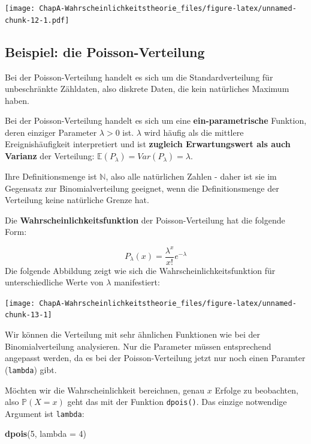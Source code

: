 \documentclass[]{book}
\newenvironment{Shaded}{\begin{snugshade}}{\end{snugshade}}
\newcommand{\KeywordTok}[1]{\textcolor[rgb]{0.13,0.29,0.53}{\textbf{#1}}}
\newcommand{\DataTypeTok}[1]{\textcolor[rgb]{0.13,0.29,0.53}{#1}}
\newcommand{\DecValTok}[1]{\textcolor[rgb]{0.00,0.00,0.81}{#1}}
\newcommand{\NormalTok}[1]{#1}
\begin{document}
\texttt{[image: ChapA-Wahrscheinlichkeitstheorie\_files/figure-latex/unnamed-chunk-12-1.pdf]}

\subsection{Beispiel: die
Poisson-Verteilung}\label{beispiel-die-poisson-verteilung}

Bei der Poisson-Verteilung handelt es sich um die Standardverteilung für
unbeschränkte Zähldaten, also diskrete Daten, die kein natürliches
Maximum haben.

Bei der Poisson-Verteilung handelt es sich um eine
\textbf{ein-parametrische} Funktion, deren einziger Parameter
\(\lambda>0\) ist. \(\lambda\) wird häufig als die mittlere
Ereignishäufigkeit interpretiert und ist \textbf{zugleich Erwartungswert
als auch Varianz} der Verteilung:
\(\mathbb{E}(P_\lambda)=Var(P_\lambda)=\lambda\).

Ihre Definitionsmenge ist \(\mathbb{N}\), also alle natürlichen Zahlen -
daher ist sie im Gegensatz zur Binomialverteilung geeignet, wenn die
Definitionsmenge der Verteilung keine natürliche Grenze hat.

Die \textbf{Wahrscheinlichkeitsfunktion} der Poisson-Verteilung hat die
folgende Form:

\[P_\lambda(x)=\frac{\lambda^x}{x!}e^{-\lambda}\] Die folgende Abbildung
zeigt wie sich die Wahrscheinlichkeitsfunktion für unterschiedliche
Werte von \(\lambda\) manifestiert:

\begin{center}\texttt{[image: ChapA-Wahrscheinlichkeitstheorie\_files/figure-latex/unnamed-chunk-13-1]} \end{center}

Wir können die Verteilung mit sehr ähnlichen Funktionen wie bei der
Binomialverteilung analysieren. Nur die Parameter müssen entsprechend
angepasst werden, da es bei der Poisson-Verteilung jetzt nur noch einen
Paramter (\texttt{lambda}) gibt.

Möchten wir die Wahrscheinlichkeit bereichnen, genau \(x\) Erfolge zu
beobachten, also \(\mathbb{P}(X=x)\) geht das mit der Funktion
\texttt{dpois()}. Das einzige notwendige Argument ist \texttt{lambda}:

\begin{Shaded}
\begin{Highlighting}[]
\KeywordTok{dpois}\NormalTok{(}\DecValTok{5}\NormalTok{, }\DataTypeTok{lambda =} \DecValTok{4}\NormalTok{)}
\end{Highlighting}
\end{Shaded}
\end{document}
